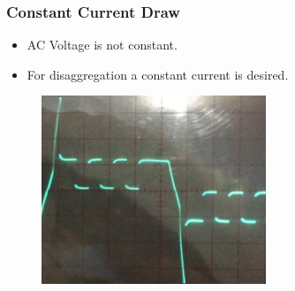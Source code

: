 \documentclass{beamer}
\begin{document}
	\begin{frame}\frametitle{Constant Current Draw}
		\begin{itemize}
			\item AC Voltage is not constant.
			\item For disaggregation a constant current is desired.
		\end{itemize}
		\begin{figure}
			\centering
			\includegraphics[width=0.6\textwidth]{../chapters/hardware-chapters/AC/ac-modulator/custom-hardware/ac-current-source/current-source-measurement-cropped.png}
		\end{figure}


	\end{frame}




	

\end{document}
